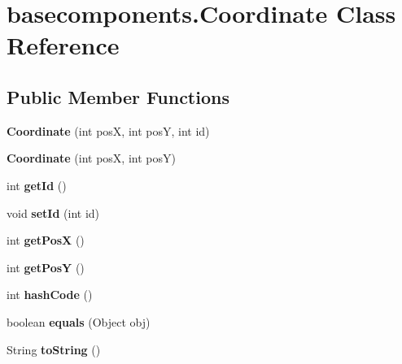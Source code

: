 \hypertarget{classbasecomponents_1_1_coordinate}{\section{basecomponents.\-Coordinate Class Reference}
\label{classbasecomponents_1_1_coordinate}
}
\subsection*{Public Member Functions}
\begin{DoxyCompactItemize}
\item 
\hypertarget{classbasecomponents_1_1_coordinate_a48604d7377afb6842b5088f75a5ce49c}{{\bfseries Coordinate} (int pos\-X, int pos\-Y, int id)}\label{classbasecomponents_1_1_coordinate_a48604d7377afb6842b5088f75a5ce49c}

\item 
\hypertarget{classbasecomponents_1_1_coordinate_a7c5dd25c9864d6e49d4ef7e77cb4edb7}{{\bfseries Coordinate} (int pos\-X, int pos\-Y)}\label{classbasecomponents_1_1_coordinate_a7c5dd25c9864d6e49d4ef7e77cb4edb7}

\item 
\hypertarget{classbasecomponents_1_1_coordinate_a0090a5d5c65185d64195d09ec62fc496}{int {\bfseries get\-Id} ()}\label{classbasecomponents_1_1_coordinate_a0090a5d5c65185d64195d09ec62fc496}

\item 
\hypertarget{classbasecomponents_1_1_coordinate_acea2240d0420718020f9c767ddf5b41a}{void {\bfseries set\-Id} (int id)}\label{classbasecomponents_1_1_coordinate_acea2240d0420718020f9c767ddf5b41a}

\item 
\hypertarget{classbasecomponents_1_1_coordinate_abc67465a85691a3d335e6660a34a070a}{int {\bfseries get\-Pos\-X} ()}\label{classbasecomponents_1_1_coordinate_abc67465a85691a3d335e6660a34a070a}

\item 
\hypertarget{classbasecomponents_1_1_coordinate_a2625696445643b9a8fbf61ea7319b4b2}{int {\bfseries get\-Pos\-Y} ()}\label{classbasecomponents_1_1_coordinate_a2625696445643b9a8fbf61ea7319b4b2}

\item 
\hypertarget{classbasecomponents_1_1_coordinate_ab489e8325a98fed98ce10bc1c611db4c}{int {\bfseries hash\-Code} ()}\label{classbasecomponents_1_1_coordinate_ab489e8325a98fed98ce10bc1c611db4c}

\item 
\hypertarget{classbasecomponents_1_1_coordinate_a21b77dcdb9d029e61f921361482c74d5}{boolean {\bfseries equals} (Object obj)}\label{classbasecomponents_1_1_coordinate_a21b77dcdb9d029e61f921361482c74d5}

\item 
\hypertarget{classbasecomponents_1_1_coordinate_a19e736b33fadd1eade783509f170af87}{String {\bfseries to\-String} ()}\label{classbasecomponents_1_1_coordinate_a19e736b33fadd1eade783509f170af87}

\end{DoxyCompactItemize}


